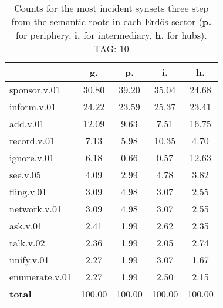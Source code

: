 \begin{table}[h!]
\begin{center}
\begin{tabular}{| l | c | c | c | c |}\hline
 & g. & p. & i. & h. \\\hline
sponsor.v.01 & 30.80  & 39.20  & 35.04  & 24.68 \\\hline
inform.v.01 & 24.22  & 23.59  & 25.37  & 23.41 \\\hline
add.v.01 & 12.09  & 9.63  & 7.51  & 16.75 \\\hline
record.v.01 & 7.13  & 5.98  & 10.35  & 4.70 \\\hline
ignore.v.01 & 6.18  & 0.66  & 0.57  & 12.63 \\\hline
see.v.05 & 4.09  & 2.99  & 4.78  & 3.82 \\\hline
fling.v.01 & 3.09  & 4.98  & 3.07  & 2.55 \\\hline
network.v.01 & 3.09  & 4.98  & 3.07  & 2.55 \\\hline
ask.v.01 & 2.41  & 1.99  & 2.62  & 2.35 \\\hline
talk.v.02 & 2.36  & 1.99  & 2.05  & 2.74 \\\hline
unify.v.01 & 2.27  & 1.99  & 3.07  & 1.67 \\\hline
enumerate.v.01 & 2.27  & 1.99  & 2.50  & 2.15 \\\hline
{{\bf total}} & 100.00  & 100.00  & 100.00  & 100.00 \\\hline
\end{tabular}
\caption{Counts for the most incident synsets three step from the semantic roots in each Erd\"os sector ({\bf p.} for periphery, {\bf i.} for intermediary, {\bf h.} for hubs). TAG: 10}
\end{center}
\end{table}